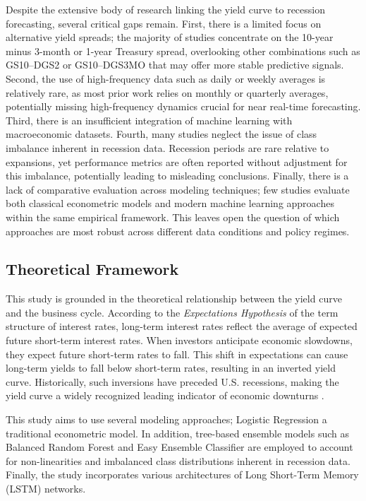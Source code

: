 Despite the extensive body of research linking the yield curve to recession forecasting, several critical gaps remain. First, there is a limited focus on alternative yield spreads; the majority of studies concentrate on the 10-year minus 3-month or 1-year Treasury spread,
overlooking other combinations such as GS10–DGS2 or GS10–DGS3MO that may offer %
more stable predictive signals.
Second, the use of high-frequency data such as daily or weekly averages is relatively
rare, as most prior work relies on monthly or quarterly averages, potentially missing high-frequency dynamics crucial for near real-time forecasting.
Third, there is an insufficient integration of machine learning with macroeconomic datasets. %
Fourth, many studies neglect the issue of class imbalance inherent in recession data. Recession periods are rare relative to expansions, yet performance metrics are often reported without adjustment for this imbalance, potentially leading to misleading conclusions.
Finally, there is a lack of comparative evaluation across modeling techniques; few studies evaluate both classical econometric models and modern machine learning approaches within the same empirical framework. This leaves open the question of which approaches are most robust across different data conditions and policy regimes.


\subsection{Theoretical Framework}
This study is grounded in the theoretical relationship between the yield curve and the business cycle. According to the \textit{Expectations Hypothesis} of the term structure of interest rates, long-term interest rates reflect the average of expected future short-term interest rates. When investors anticipate economic slowdowns, they expect future short-term rates to fall. This shift in expectations can cause long-term yields to fall below short-term rates, resulting in an inverted yield curve. Historically, such inversions have preceded U.S. recessions, making the yield curve a widely recognized leading indicator of economic downturns \parencite{estrella1998predicting}.

This study aims to use several modeling approaches; Logistic Regression a traditional econometric model. In addition, tree-based ensemble models such as Balanced Random Forest and Easy Ensemble Classifier are employed to account for non-linearities and imbalanced class distributions inherent in recession data. Finally, the study incorporates various architectures of Long Short-Term Memory (LSTM) networks. 





